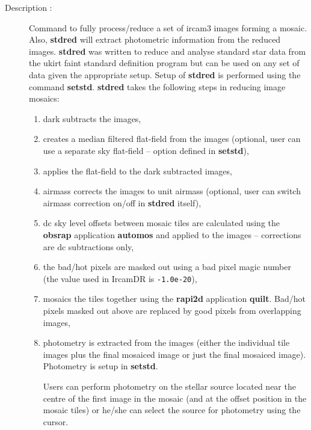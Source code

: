 \begin{description}

\item[Description :] Command to fully process/reduce a set of {\sc
ircam3} images forming a mosaic.  Also, {\bf stdred} will extract
photometric information from the reduced images.  {\bf stdred} was
written to reduce and analyse standard star data from the {\sc ukirt}
faint standard definition program but can be used on any set of data
given the appropriate setup.  Setup of {\bf stdred} is performed using
the command {\bf setstd}.  {\bf stdred} takes the following steps in
reducing image mosaics:

\begin{enumerate}

\item dark subtracts the images, 

\item creates a median filtered flat-field from the images
(optional, user can use a separate sky flat-field -- option defined in
{\bf setstd}),

\item applies the flat-field to the dark subtracted images,

\item airmass corrects the images to unit airmass (optional, user
can switch airmass correction on/off in {\bf stdred} itself),

\item dc sky level offsets between mosaic tiles are calculated
using the {\bf obsrap} application {\bf automos} and applied to the
images -- corrections are dc subtractions only,

\item the bad/hot pixels are masked out using a bad pixel magic
number (the value used in {\sc IrcamDR} is {\tt -1.0e-20}),

\item mosaics the tiles together using the {\bf rapi2d}
application {\bf quilt}.  Bad/hot pixels masked out above are replaced
by good pixels from overlapping images,

\item photometry is extracted from the images (either the
individual tile images plus the final mosaiced image or just the final
mosaiced image).  Photometry is setup in {\bf setstd}.  

Users can perform photometry on the stellar source located near the
centre of the first image in the mosaic (and at the offset position in
the mosaic tiles) or he/she can select the source for photometry using
the cursor.


\end{enumerate}
\end{description}
